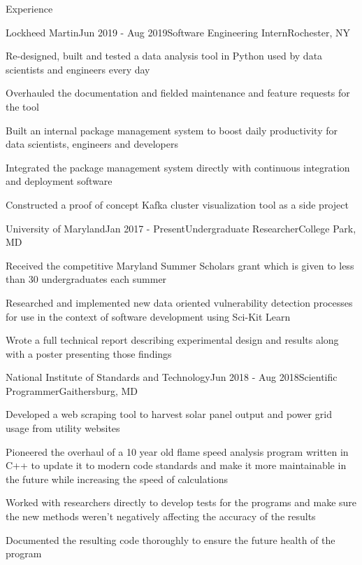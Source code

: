 \documentclass{resume} %
\begin{document}
\begin{rSection}{Experience}


\begin{rSubsection}{Lockheed Martin}{Jun 2019 - Aug 2019}{Software Engineering Intern}{Rochester, NY}
\item Re-designed, built and tested a data analysis tool in Python used by data scientists and engineers every day
\item Overhauled the documentation and fielded maintenance and feature requests for the tool
\item Built an internal package management system to boost daily productivity for data scientists, engineers and developers
\item Integrated the package management system directly with continuous integration and deployment software
\item Constructed a proof of concept Kafka cluster visualization tool as a side project
\end{rSubsection}


\begin{rSubsection}{University of Maryland}{Jan 2017 - Present}{Undergraduate Researcher}{College Park, MD}
\item Received the competitive Maryland Summer Scholars grant which is given to less than 30 undergraduates each summer
\item Researched and implemented new data oriented vulnerability detection processes for use in the context of software development using Sci-Kit Learn
\item Wrote a full technical report describing experimental design and results along with a poster presenting those findings
\end{rSubsection}


\begin{rSubsection}{National Institute of Standards and Technology}{Jun 2018 - Aug 2018}{Scientific Programmer}{Gaithersburg, MD}
\item Developed a web scraping tool to harvest solar panel output and power grid usage from utility websites
\item Pioneered the overhaul of a 10 year old flame speed analysis program written in C++ to update it to modern code standards and make it more maintainable in the future while increasing the speed of calculations
\item Worked with researchers directly to develop tests for the programs and make sure the new methods weren't negatively affecting the accuracy of the results
\item Documented the resulting code thoroughly to ensure the future health of the program
\end{rSubsection}


\end{rSection}
\end{document}
